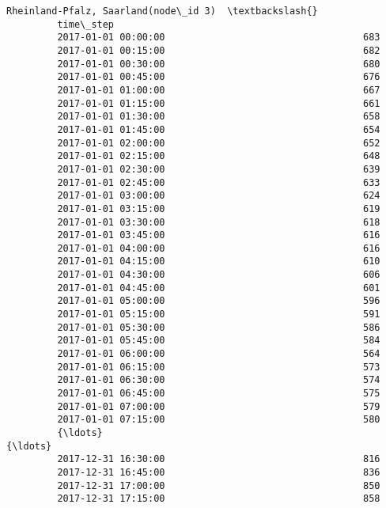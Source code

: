 \documentclass[11pt]{article}
\begin{document}
\begin{Verbatim}[commandchars=\\\{\}]
                              Rheinland-Pfalz, Saarland(node\_id 3)  \textbackslash{}
         time\_step                                                   
         2017-01-01 00:00:00                                   683   
         2017-01-01 00:15:00                                   682   
         2017-01-01 00:30:00                                   680   
         2017-01-01 00:45:00                                   676   
         2017-01-01 01:00:00                                   667   
         2017-01-01 01:15:00                                   661   
         2017-01-01 01:30:00                                   658   
         2017-01-01 01:45:00                                   654   
         2017-01-01 02:00:00                                   652   
         2017-01-01 02:15:00                                   648   
         2017-01-01 02:30:00                                   639   
         2017-01-01 02:45:00                                   633   
         2017-01-01 03:00:00                                   624   
         2017-01-01 03:15:00                                   619   
         2017-01-01 03:30:00                                   618   
         2017-01-01 03:45:00                                   616   
         2017-01-01 04:00:00                                   616   
         2017-01-01 04:15:00                                   610   
         2017-01-01 04:30:00                                   606   
         2017-01-01 04:45:00                                   601   
         2017-01-01 05:00:00                                   596   
         2017-01-01 05:15:00                                   591   
         2017-01-01 05:30:00                                   586   
         2017-01-01 05:45:00                                   584   
         2017-01-01 06:00:00                                   564   
         2017-01-01 06:15:00                                   573   
         2017-01-01 06:30:00                                   574   
         2017-01-01 06:45:00                                   575   
         2017-01-01 07:00:00                                   579   
         2017-01-01 07:15:00                                   580   
         {\ldots}                                                   {\ldots}   
         2017-12-31 16:30:00                                   816   
         2017-12-31 16:45:00                                   836   
         2017-12-31 17:00:00                                   850   
         2017-12-31 17:15:00                                   858   

\end{Verbatim}
\end{document}
